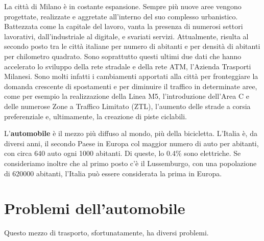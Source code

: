 La città di Milano è in costante espansione. Sempre più nuove aree vengono progettate, realizzate e aggretate all'interno del suo complesso urbanistico. Battezzata come la capitale del lavoro, vanta la presenza di numerosi settori lavorativi, dall'industriale al digitale, e svariati servizi. Attualmente, risulta al secondo posto tra le città italiane per numero di abitanti e per densità di abitanti per chilometro quadrato. Sono soprattutto questi ultimi due dati che hanno accelerato lo sviluppo della rete stradale e della rete ATM, l'Azienda Trasporti Milanesi. Sono molti infatti i cambiamenti apportati alla città per fronteggiare la domanda crescente di spostamenti e per diminuire il traffico in determinate aree, come per esempio la realizzazione della Linea M5, l'introduzione dell'Area C e delle numerose Zone a Traffico Limitato (ZTL), l'aumento delle strade a corsia preferenziale e, ultimamente, la creazione di piste ciclabili.

















L'\textbf{automobile} è il mezzo più diffuso al mondo, più della bicicletta. L'Italia è, da diversi anni, il secondo Paese in Europa col maggior numero di auto per abitanti, con circa 640 auto ogni 1000 abitanti\cite{eurostatcars}. Di queste, lo 0.4\% sono elettriche\cite{anfiastudiestatistiche}. Se consideriamo inoltre che al primo posto c'è il Lussemburgo, con una popolazione di 620000 abitanti, l'Italia può essere considerata la prima in Europa. 

\section{Problemi dell'automobile}

Questo mezzo di trasporto, sfortunatamente, ha diversi problemi.

